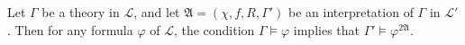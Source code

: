 Let $\Gamma$ be a theory in $\mathcal{L}$, and let $\mathfrak{A} = (\chi, f, R, \Gamma')$ be an interpretation of $\Gamma$ in $\mathcal{L}'$. Then for any formula $\varphi$ of $\mathcal{L}$, the condition $\Gamma \models \varphi$ implies that $\Gamma' \models \varphi^{2\mathfrak{A}}$.
